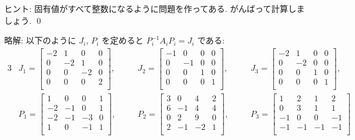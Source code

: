 \documentclass[12pt,twoside]{jarticle}
\newcommand\commentout[1]{#1}
\newcommand\commentout[1]{}
\begin{document}
\noindent
ヒント: 固有値がすべて整数になるように問題を作ってある. 
がんばって計算しましょう. 
\qed

\commentout{
\medskip
\noindent
略解: 以下のように $J_i$, $P_i$ を定めると $P_i^{-1}A_iP_i=J_i$ である:
{\small
\begin{alignat*}{3}
  &
  J_1 =
  \begin{bmatrix}
    -2 &  1 &  0 &  0 \\
     0 & -2 &  1 &  0 \\
     0 &  0 & -2 &  0 \\
     0 &  0 &  0 &  2 \\
  \end{bmatrix},
  & \quad &
  J_2 =
  \begin{bmatrix}
    -1 &  0 &  0 &  0 \\
     0 & -1 &  0 &  0 \\
     0 &  0 &  1 &  0 \\
     0 &  0 &  0 &  1 \\
  \end{bmatrix},
  & \quad &
  J_3 =
  \begin{bmatrix}
    -2 &  1 &  0 &  0 \\
     0 & -2 &  0 &  0 \\
     0 &  0 &  1 &  0 \\
     0 &  0 &  0 &  1 \\
  \end{bmatrix},
  \\ &
  P_1 =
  \begin{bmatrix}
     1 &  0 &  0 &  1 \\
    -2 & -1 &  0 &  1 \\
    -2 & -1 & -3 &  0 \\
     1 &  0 & -1 &  1 \\
  \end{bmatrix},
  & \quad &
  P_2 =
  \begin{bmatrix}
     3 &  0 &  4 &  2 \\
     6 & -1 &  4 &  4 \\
     0 &  2 &  9 &  0 \\
     2 & -1 & -2 &  1 \\
  \end{bmatrix},
  & \quad &
  P_3 =
  \begin{bmatrix}
     1 &  2 &  1 &  2 \\
     0 &  3 &  1 &  1 \\
    -1 &  0 &  0 & -1 \\
    -1 & -1 & -1 & -1 \\

\end{bmatrix}
\end{alignat*}}}
\end{document}
